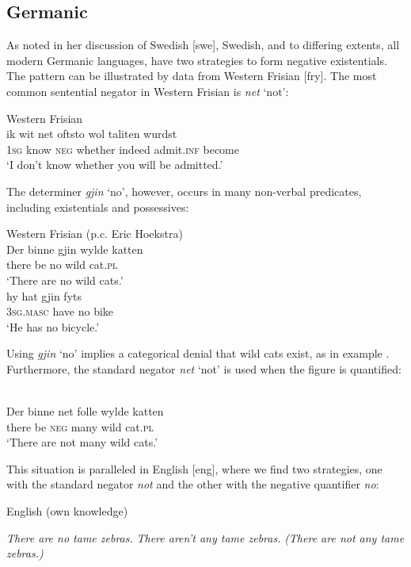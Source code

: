 ﻿\documentclass[output=paper]{langsci/langscibook}
\begin{document}
\subsection{Germanic}\label{sec:ieur-4.5}


As \citet[114--115]{Veselinova2013} noted in her discussion of
Swedish [swe], Swedish, and to differing extents, all modern
Germanic languages, have two strategies to form negative
existentials. The pattern can be illustrated by data from Western
Frisian [fry]. The most common sentential negator in Western Frisian is \textit{net} `not':
%
\begin{exe}\ex
Western Frisian \citep[91]{Tiersma1999}\\
    \gll ik    wit     net   oftsto     wol      taliten      wurdst \\
\textsc{1sg} know \textsc{neg} whether indeed admit.\textsc{inf} become\\
    \glt `I don't know whether you will be admitted.' 
    \end{exe}
%
The determiner \textit{gjin} `no', however, occurs in many non-verbal predicates, including existentials and possessives:
%
\begin{exe}\ex\label{ex:ieur-frisian-nowildcatsnow}
Western Frisian (p.c. Eric Hoekstra)\\
    \gll Der   binne gjin wylde katten \\
there be       no   wild   cat.\textsc{pl} \\
    \glt `There are no wild cats.' 
\ex
{}\\
    \gll hy hat   gjin fyts \\
  \textsc{3sg.masc} have no   bike \\
    \glt `He has no bicycle.'
    \end{exe} 
%
Using \textit{gjin} `no' implies a categorical denial that wild cats exist, as in example . Furthermore, the standard negator \textit{net} `not' is used when the figure is quantified:
%
\begin{exe}\ex
{}\\
    \gll Der   binne  net   folle  wylde katten \\
there be       \textsc{neg} many wild   cat.\textsc{pl} \\
    \glt `There are not many wild cats.' 
    \end{exe}
%
This situation is paralleled in English [eng], where we find two strategies, one with the standard negator \textit{not} and the other with the negative quantifier \textit{no}:
%
\begin{exe}\ex English (own knowledge)\begin{xlist}
        \ex\label{ex:ieur-english-no-tame-zebras}
     \textit{There are no tame zebras.}
\ex \textit{There aren’t any tame zebras.} \textit{(There are not any tame zebras.)}
    \end{xlist}\end{exe}
\end{document}
